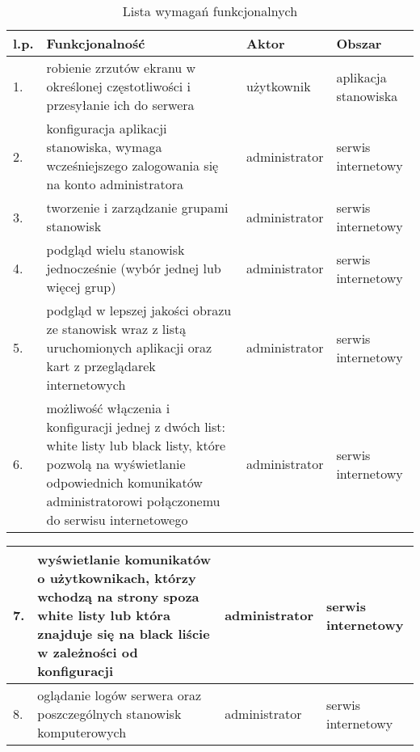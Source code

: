 \begin{center}
\begin{table}[!ht]
\caption{\label{tab:widgets}Lista wymagań funkcjonalnych}
\begin{tabular}{| m{0.5cm} | m{8cm} | m{3cm} | m{2cm} |}
\hline
l.p. 
    & Funkcjonalność 
    & Aktor 
    & Obszar 
\\ \hline
    1.   
    & robienie zrzutów ekranu w określonej częstotliwości i przesyłanie ich do serwera
    & użytkownik
    & aplikacja stanowiska
\\ \hline
    2. 
    &konfiguracja aplikacji stanowiska, wymaga wcześniejszego zalogowania się na konto administratora
    &administrator
    & serwis internetowy
\\ \hline
    3.
    & tworzenie i zarządzanie grupami stanowisk
    & administrator
    & serwis internetowy
\\ \hline
    4. 
    &podgląd wielu stanowisk jednocześnie (wybór jednej lub więcej grup)
    &administrator
    &serwis internetowy
\\ \hline
    5. 
    & podgląd w lepszej jakości obrazu ze stanowisk wraz z listą uruchomionych aplikacji oraz kart z przeglądarek internetowych
    & administrator
    & serwis internetowy
\\ \hline
    6.
    & możliwość włączenia i konfiguracji jednej z dwóch list: white listy lub black listy, które pozwolą na wyświetlanie odpowiednich komunikatów administratorowi połączonemu do serwisu internetowego
    & administrator
    & serwis internetowy
\\ \hline

\end{tabular}\end{table}


\begin{tabular}{| m{0.5cm} | m{8cm} | m{3cm} | m{2cm} |}
\hline 

    7.
    & wyświetlanie komunikatów o użytkownikach, którzy wchodzą na strony spoza white listy lub która znajduje się na black liście w zależności od konfiguracji
    & administrator
    & serwis internetowy
\\ \hline
    8.
    & oglądanie logów serwera oraz poszczególnych stanowisk komputerowych
    & administrator
    & serwis internetowy
\\ \hline
    
\end{tabular}


\end{center}

